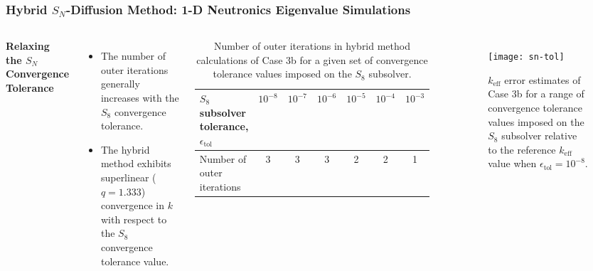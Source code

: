 \begin{frame}
  \frametitle{Hybrid $S_N$-Diffusion Method: 1-D Neutronics Eigenvalue Simulations}
  \begin{columns}
    \column{7cm}
    \textbf{Relaxing the $S_N$ Convergence Tolerance}
    \begin{itemize}
      \item The number of outer iterations generally increases with the $S_8$ convergence tolerance.
      \item The hybrid method exhibits superlinear ($q=1.333$) convergence in $k$ with respect to
        the $S_8$ convergence tolerance value.
    \end{itemize}
    \begin{table}[h]
      \centering
      \caption{Number of outer iterations in hybrid method calculations of Case 3b for a given set of
      convergence tolerance values imposed on the $S_8$ subsolver.}
      \small
      \setlength\tabcolsep{2pt}
      \begin{tabular}{l S S S S S S}
        \toprule
        $S_8$ subsolver tolerance, $\epsilon_\text{tol}$ & {$10^{-8}$} & {$10^{-7}$} & {$10^{-6}$} & {$10^{-5}$} & {$10^{-4}$} & {$10^{-3}$} \\
        \midrule
        Number of outer iterations & 3 & 3 & 3 & 2 & 2 & 1 \\
        \bottomrule
      \end{tabular}
      \label{table:sn-tol}
    \end{table}
    \column{4cm}
    \begin{figure}[h]
      \centering
      \texttt{[image: sn-tol]}
      \caption{$k_\text{eff}$ error estimates of Case 3b for a range of convergence tolerance values
      imposed on the $S_8$ subsolver relative to the reference $k_\text{eff}$ value when
      $\epsilon_\text{tol}=10^{-8}$.}
      \label{fig:sn-tol}
    \end{figure}
  \end{columns}
\end{frame}
